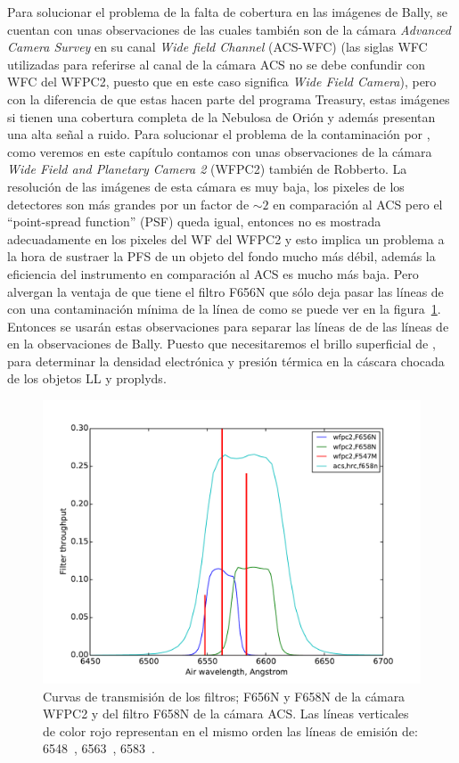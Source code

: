  Para solucionar el problema de la falta de cobertura en las imágenes de Bally, se cuentan con unas observaciones de \citet{Robberto:2013a} las cuales también son de la cámara \textit{Advanced Camera Survey} en su canal \textit{Wide field Channel} (ACS-WFC) (las siglas WFC utilizadas para referirse al canal de la cámara ACS no se debe confundir con WFC del WFPC2, puesto que en este caso significa \textit{Wide Field Camera}), pero con la diferencia de que estas hacen parte del programa Treasury, estas imágenes si tienen una cobertura completa de la Nebulosa de Orión y además presentan una alta señal a ruido. Para solucionar el problema de la contaminación por \nii{}, como veremos en este capítulo contamos con unas observaciones de la cámara  \textit{Wide Field and Planetary Camera 2} (WFPC2) también de Robberto. La resolución de las imágenes de esta cámara es muy baja, los pixeles de los detectores son más grandes por un factor de \(\sim2\) en comparación al ACS pero el ``point-spread function'' (PSF) queda igual, entonces no es mostrada adecuadamente en los pixeles del WF del WFPC2 y esto implica un problema a la hora de sustraer la PFS de un objeto del fondo mucho más débil, además la eficiencia del instrumento en comparación al ACS es mucho más baja. Pero alvergan la ventaja de que tiene el filtro F656N que sólo deja pasar las líneas de \ha{} con una contaminación mínima de la línea de \nii{} como se puede ver en la figura~\ref{fig:transmision}. Entonces se usarán estas observaciones para separar las líneas de \ha{} de las líneas de \nii{} en la observaciones de Bally. Puesto que necesitaremos el brillo superficial de \ha{}, para determinar la densidad electrónica y presión térmica en la cáscara chocada de los objetos LL y proplyds.\\

 \begin{figure}
   \centering
    \includegraphics[width=\linewidth, trim=0.7 0.7 0.7 30, clip]{luis-programas/will-filter}
   \caption{Curvas de transmisión de los filtros; F656N y F658N  de la cámara WFPC2 y del filtro F658N de la cámara ACS. Las líneas verticales de color rojo representan en el mismo orden las líneas de emisión de: \nii{} 6548~\A{}, \ha{} 6563~\A{}, \nii{} 6583~\A{}. }
   \label{fig:transmision}
 \end{figure}

